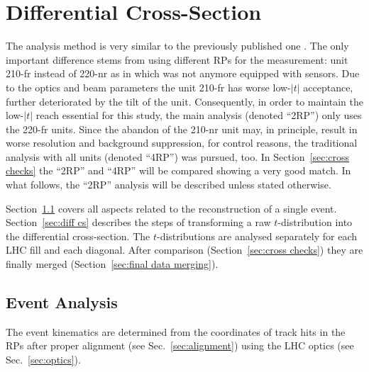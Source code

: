 \section{Differential Cross-Section}
\label{sec:differential cross-section}

The analysis method is very similar to the previously published one \cite{totem-8tev-1km}. The only important difference stems from using different RPs for the measurement: unit 210-fr instead of 220-nr as in \cite{totem-8tev-1km} which was not anymore equipped with sensors. Due to the optics and beam parameters the unit 210-fr has worse low-$|t|$ acceptance, further deteriorated by the tilt of the unit. Consequently, in order to maintain the low-$|t|$ reach essential for this study, the main analysis (denoted ``2RP'') only uses the 220-fr units. Since the abandon of the 210-nr unit may, in principle, result in worse resolution and background suppression, for control reasons, the traditional analysis with all units (denoted ``4RP'') was pursued, too. In Section~\ref{sec:cross checks} the ``2RP'' and ``4RP'' will be compared showing a very good match. In what follows, the ``2RP'' analysis will be described unless stated otherwise.



Section~\ref{sec:event analysis} covers all aspects related to the reconstruction of a single event. Section~\ref{sec:diff cs} describes the steps of transforming a raw $t$-distribution into the differential cross-section. The $t$-distributions are analysed separately for each LHC fill and each diagonal. After comparison (Section~\ref{sec:cross checks}) they are finally merged (Section~\ref{sec:final data merging}).

\subsection{Event Analysis}
\label{sec:event analysis}

The event kinematics are determined from the coordinates of track hits in the RPs after proper alignment (see Sec.~\ref{sec:alignment}) using the LHC optics (see Sec.~\ref{sec:optics}).


